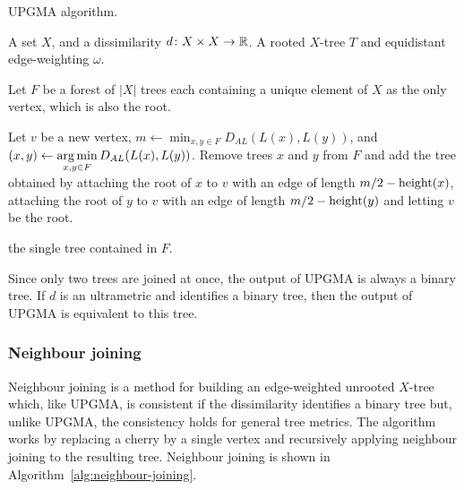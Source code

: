 \begin{algorithm}[h]
  \caption{UPGMA algorithm.}
  \label{alg:upgma}

  \begin{algorithmic}
    \Require A set $X$, and a dissimilarity $d \colon X \times X \to {\mathbb R}$.
    \Ensure  A rooted $X$-tree $T$ and equidistant edge-weighting $\omega$.

    \State Let $F$ be a forest of $|X|$ trees each containing a unique element
    of $X$ as the only vertex, which is also the root.


       \State Let $v$ be a new vertex, $\displaystyle m \gets \min_{x,y
         \in F} D_{AL}(L(x),L(y))$, and $\displaystyle (x,y) \gets \operatorname*{arg\,min}_{x,y
         \in F} D_{AL}(L(x),L(y))$.
       \State Remove trees $x$ and $y$ from $F$ and add the tree obtained by
         attaching the root of $x$ to $v$ with an edge of length $m/2 -
         \operatorname{height}(x)$, attaching the root of $y$ to $v$ with an edge of length
         $m/2 - \operatorname{height}(y)$ and letting $v$ be the root.
    
    \EndWhile

    \State \Return the single tree contained in $F$.
  \end{algorithmic}
\end{algorithm}

Since only two trees are joined at once, the output of UPGMA is always a
binary tree.  If $d$ is an ultrametric and identifies a binary tree, then the
output of UPGMA is equivalent to this tree.

\subsubsection{Neighbour joining}
\label{sec:neighbour-joining}

Neighbour joining is a method for building an edge-weighted unrooted $X$-tree
which, like UPGMA, is consistent if the dissimilarity identifies a binary
tree but, unlike UPGMA, the consistency holds for general tree metrics.  The
algorithm works by replacing a cherry by a single vertex and recursively
applying neighbour joining to the resulting tree.  Neighbour joining is shown
in Algorithm~\ref{alg:neighbour-joining}.

